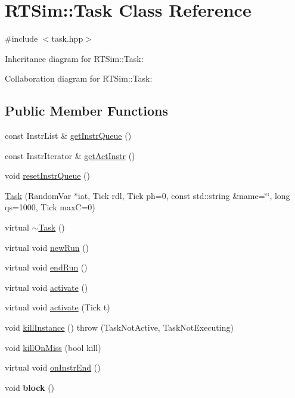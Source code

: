 \hypertarget{classRTSim_1_1Task}{}\section{R\+T\+Sim\+:\+:Task Class Reference}
\label{classRTSim_1_1Task}


{\ttfamily \#include $<$task.\+hpp$>$}



Inheritance diagram for R\+T\+Sim\+:\+:Task\+:


Collaboration diagram for R\+T\+Sim\+:\+:Task\+:
\subsection*{Public Member Functions}
\begin{DoxyCompactItemize}
\item 
const Instr\+List \& \hyperlink{classRTSim_1_1Task_a39cb1cbb9feac69676969de2e2872379}{get\+Instr\+Queue} ()
\item 
const Instr\+Iterator \& \hyperlink{classRTSim_1_1Task_a32a6b6705e5e64474057154f18621867}{get\+Act\+Instr} ()
\item 
void \hyperlink{classRTSim_1_1Task_a0e845b88958c1daa4a661c7870682d83}{reset\+Instr\+Queue} ()
\item 
\hyperlink{classRTSim_1_1Task_a7db5446f507537c11b533ac92e05afb7}{Task} (Random\+Var $\ast$iat, Tick rdl, Tick ph=0, const std\+::string \&name=\char`\"{}\char`\"{}, long qs=1000, Tick maxC=0)
\item 
virtual \hyperlink{classRTSim_1_1Task_a407e6d6dc7aa42b253c7767231b8343e}{$\sim$\+Task} ()
\item 
virtual void \hyperlink{classRTSim_1_1Task_a20ba7201d13480a1328686666b916c3e}{new\+Run} ()
\item 
virtual void \hyperlink{classRTSim_1_1Task_ad6b6b4f089d9b8cf38baeb3aae3f436c}{end\+Run} ()
\item 
virtual void \hyperlink{classRTSim_1_1Task_acf0a63d51c6a763cff175932239db3c5}{activate} ()
\item 
virtual void \hyperlink{classRTSim_1_1Task_a32a9f34149d023a0acd49b5ec1c5a5bd}{activate} (Tick t)
\item 
void \hyperlink{classRTSim_1_1Task_aeb01f785a2a53a56fb12497894000008}{kill\+Instance} ()  throw (\+Task\+Not\+Active, Task\+Not\+Executing)
\item 
void \hyperlink{classRTSim_1_1Task_ac96883083c212b594a3e8a5165c2ba0e}{kill\+On\+Miss} (bool kill)
\item 
virtual void \hyperlink{classRTSim_1_1Task_a17a1b148a33f6e84e5bcb42c2461b66b}{on\+Instr\+End} ()
\item 
void {\bfseries block} ()\hypertarget{classRTSim_1_1Task_ac45a361f5df1cc2ea183d90caf6b205a}{}\label{classRTSim_1_1Task_ac45a361f5df1cc2ea183d90caf6b205a}


\end{DoxyCompactItemize}
